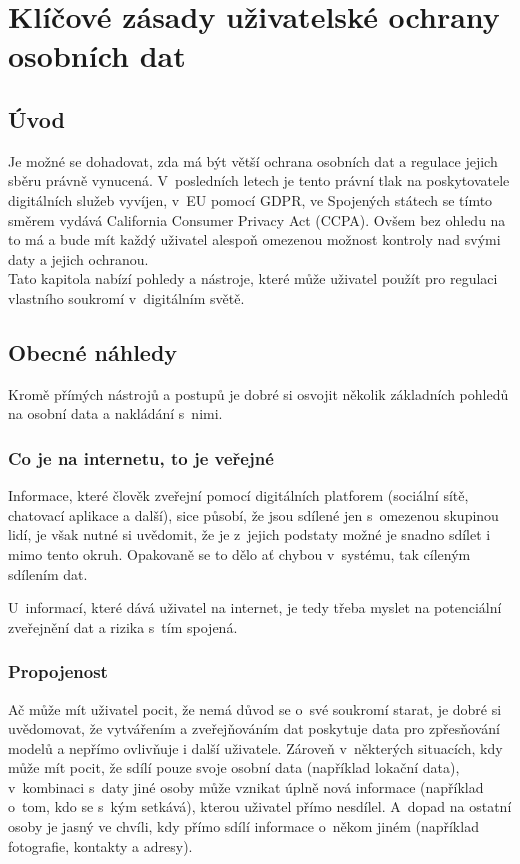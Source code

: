 \chapter{Klíčové zásady uživatelské ochrany osobních dat}

\section*{Úvod}
Je možné se dohadovat, zda má být větší ochrana osobních dat a regulace jejich sběru právně vynucená. V~posledních letech je tento právní tlak na poskytovatele digitálních služeb vyvíjen, v~EU pomocí GDPR, ve Spojených státech se tímto směrem vydává California Consumer Privacy Act (CCPA).
Ovšem bez ohledu na to má a bude mít každý uživatel alespoň omezenou možnost kontroly nad svými daty a jejich ochranou.\\
Tato kapitola nabízí pohledy a nástroje, které může uživatel použít pro regulaci vlastního soukromí v~digitálním světě.

\section{Obecné náhledy}
Kromě přímých nástrojů a postupů je dobré si osvojit několik základních pohledů na osobní data a nakládání s~nimi.

\subsection{Co je na internetu, to je veřejné}
Informace, které člověk zveřejní pomocí digitálních platforem (sociální sítě, chatovací aplikace a další), sice působí, že jsou sdílené jen s~omezenou skupinou lidí, je však nutné si uvědomit, že je z~jejich podstaty možné je snadno sdílet i mimo tento okruh. Opakovaně se to dělo ať chybou v~systému, tak cíleným sdílením dat.

U~informací, které dává uživatel na internet, je tedy třeba myslet na potenciální zveřejnění dat a rizika s~tím spojená.


\subsection{Propojenost}
Ač může mít uživatel pocit, že nemá důvod se o~své soukromí starat, je dobré si uvědomovat, že vytvářením a zveřejňováním dat poskytuje data pro zpřesňování modelů a nepřímo ovlivňuje i další uživatele. Zároveň v~některých situacích, kdy může mít pocit, že sdílí pouze svoje osobní data (například lokační data), v~kombinaci s~daty jiné osoby může vznikat úplně nová informace (například o~tom, kdo se s~kým setkává), kterou uživatel přímo nesdílel. A~dopad na ostatní osoby je jasný ve chvíli, kdy přímo sdílí informace o~někom jiném (například fotografie, kontakty a adresy).  

